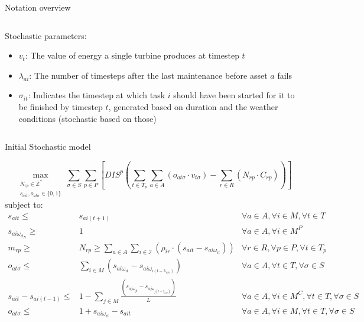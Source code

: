 \documentclass{beamer}
\begin{document}
\begin{frame}{Notation overview}
\begin{columns}
\begin{column}{.48\textwidth}
Stochastic parameters:
\begin{itemize}
\item $v_t$: The value of energy a single turbine produces at timestep $t$
\item $\lambda_{ai}$: The number of timesteps after the last maintenance before asset $a$ fails
\item $\sigma_{it}$: Indicates the timestep at which task $i$ should have been started for it to be finished by timestep $t$, generated based on duration and the weather conditions (stochastic based on those)
\end{itemize}
\end{column}
\end{columns}
\end{frame}


\begin{frame}{Initial Stochastic model}
\scriptsize

\begin{equation}
	\max_{\substack{N_{rp} \in \mathbb{Z}^* \\ 
	s_{ait}, o_{at\sigma} \in \{0, 1\}}} 
	\sum_{\sigma \in S} \sum_{p \in P} [ DIS^p (\sum_{t\in T_p} \sum_{a \in A} (o_{at\sigma} \cdot v_{t\sigma})  - \sum_{r\in R} (N_{rp} \cdot C_{rp})) ]
\end{equation}
subject to:
\begin{align}
s_{ait} \leq& s_{ai(t+1)}															& \forall a \in A, \forall i \in M, \forall t \in T			\\
s_{ai\omega_{it_N}} \geq& 1														& \forall a \in A, \forall i \in M^P					\\
m_{rp} \geq& N_{rp} \geq \sum_{a\in A} \sum_{i\in \mathcal{I}} (\rho_{ir} \cdot (s_{ait} - s_{ai\omega_{it}})) 		& \forall r \in R, \forall p \in P, \forall t \in T_p 			\\
o_{at\sigma} \leq& \sum_{i \in M} (s_{ai\omega_{it}} - s_{ai\omega_{i(t-\lambda_{ai\sigma})}})				& \forall a \in A, \forall t \in T, \forall \sigma \in S		\\
s_{ait} - s_{ai(t-1)} \leq& 1 - \sum_{j \in M} \frac{(s_{aj\omega_{jt}} - s_{aj\omega_{j(t-\lambda_{aj\sigma})}})}{L}	& \forall a \in A, \forall i \in M^C, \forall t \in T, \forall \sigma \in S	\\
o_{at\sigma} \leq& 1 + s_{ai\omega_{it}} - s_{ait}											& \forall a \in A, \forall i \in M, \forall t \in T, \forall \sigma \in S
\end{align}

\end{frame}
\end{document}
